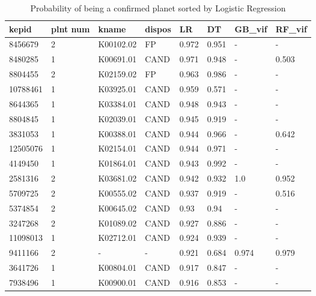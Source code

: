 \begin{table}[!htbp]
 \centering
 \caption{Probability of being a confirmed planet sorted by Logistic Regression}
 \label{dataLRDTGBvifRFviftab} 
  \begin{tabular}
{| 
 p{}| 
p{}| 
p{}| 
p{}| 
p{}| 
p{}| 
p{}| 
p{}| 
}\hline 
\textbf{kepid} &\textbf{plnt num} &\textbf{kname} &\textbf{dispos} &\textbf{LR} &\textbf{DT} &\textbf{GB\_vif} &\textbf{RF\_vif} \\ \hline 
8456679 &2 &K00102.02 &FP &0.972 &0.951 &- &- \\ \hline 
8480285 &1 &K00691.01 &CAND &0.971 &0.948 &- &0.503 \\ \hline 
8804455 &2 &K02159.02 &FP &0.963 &0.986 &- &- \\ \hline 
10788461 &1 &K03925.01 &CAND &0.959 &0.571 &- &- \\ \hline 
8644365 &1 &K03384.01 &CAND &0.948 &0.943 &- &- \\ \hline 
8804845 &1 &K02039.01 &CAND &0.945 &0.919 &- &- \\ \hline 
3831053 &1 &K00388.01 &CAND &0.944 &0.966 &- &0.642 \\ \hline 
12505076 &1 &K02154.01 &CAND &0.944 &0.971 &- &- \\ \hline 
4149450 &1 &K01864.01 &CAND &0.943 &0.992 &- &- \\ \hline 
2581316 &2 &K03681.02 &CAND &0.942 &0.932 &1.0 &0.952 \\ \hline 
5709725 &2 &K00555.02 &CAND &0.937 &0.919 &- &0.516 \\ \hline 
5374854 &2 &K00645.02 &CAND &0.93 &0.94 &- &- \\ \hline 
3247268 &2 &K01089.02 &CAND &0.927 &0.886 &- &- \\ \hline 
11098013 &1 &K02712.01 &CAND &0.924 &0.939 &- &- \\ \hline 
9411166 &2 &- &- &0.921 &0.684 &0.974 &0.979 \\ \hline 
3641726 &1 &K00804.01 &CAND &0.917 &0.847 &- &- \\ \hline 
7938496 &1 &K00900.01 &CAND &0.916 &0.853 &- &- \\ \hline 

\end{tabular}
\end{table}
